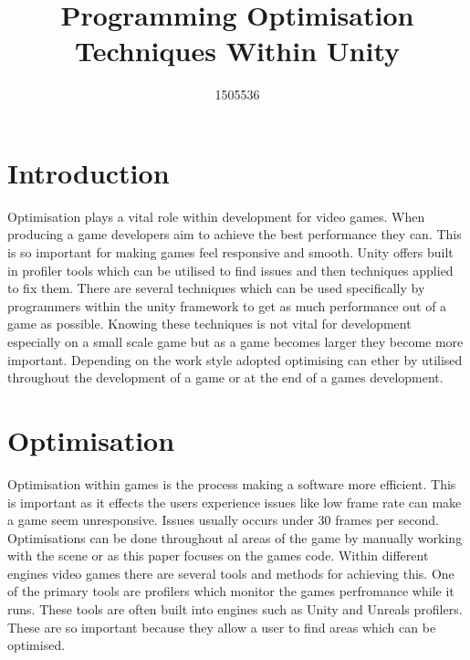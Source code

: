 \documentclass[journal]{IEEEtran}
\begin{document}
%
\title{Programming Optimisation Techniques Within Unity}

\author{1505536}


\maketitle

\section{Introduction}
Optimisation plays a vital role within development for video games.
When producing a game developers aim to achieve the best performance they can.
This is so important for making games feel responsive and smooth.
Unity offers built in profiler tools which can be utilised to find issues and then techniques applied to fix them.
There are several techniques which can be used specifically by programmers within the unity framework to get as much performance out of a game as possible.
Knowing these techniques is not vital for development especially on a small scale game but as a game becomes larger they become more important.
Depending on the work style adopted optimising can ether by utilised throughout the development of a game or at the end of a games development.

\section{Optimisation}
Optimisation within games is the process making a software more efficient.
This is important as it effects the users experience issues like low frame rate can make a game seem unresponsive.
Issues usually occurs under 30 frames per second.%
Optimisations can be done throughout al areas of the game by manually working with the scene or as this paper focuses on the games code.
Within different engines video games there are several tools and methods for achieving this.
One of the primary tools are profilers which monitor the games perfromance while it runs.
These tools are often built into engines such as Unity and Unreals profilers.
These are so important because they allow a user to find areas which can be optimised.
\end{document}
